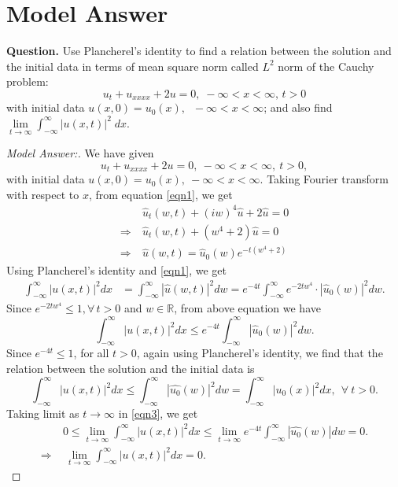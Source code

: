 \documentclass[12pt,leqno]{amsart}
\newcommand{\bb}[1]{\mathbb{#1}}
\numberwithin{equation}{section}
\theoremstyle{definition}
\begin{document}
\date{\today}

\baselineskip=16pt
\section{Model Answer}
\noindent
{\bf Question.} 
Use Plancherel's identity to find a relation between the solution and the initial data 
in terms of mean square norm called \(L^2\) norm of the Cauchy problem: 
$$u_t+u_{xxxx} +2u=0,\;-\infty < x < \infty,\, t>0$$ 
with initial data \(u(x,0)=u_0(x),\;\; -\infty < x < \infty\); and also find 
$\lim\limits_{t\to\infty} \int_{-\infty}^{\infty} |u(x,t)|^2\;dx$.

\begin{proof}[Model Answer:]
We have given 
\begin{equation}\label{eqn1}
u_t + u_{xxxx} + 2u = 0,\ -\infty < x < \infty,\ t > 0, 
\end{equation}
with initial data $u(x, 0) = u_0(x),\ -\infty < x < \infty$. 
Taking Fourier transform with respect to $x$, from equation \eqref{eqn1}, we get 
\begin{align}
&\ \widehat{u}_t(w, t) + (iw)^4\widehat{u} + 2\widehat{u} = 0 \nonumber \\
\Longrightarrow &\ \widehat{u}_t(w, t) + (w^4+2)\widehat{u} = 0 \nonumber \\ 
\Longrightarrow &\ \widehat{u}(w, t) = \widehat{u}_0(w) e^{-t(w^4+2)} \label{eqn2}
\end{align}
Using Plancherel's identity and \eqref{eqn1}, we get 
\begin{align*}
\int_{-\infty}^\infty |u(x, t)|^2 dx & = \int_{-\infty}^\infty |\widehat{u}(w, t)|^2 dw 
= e^{-4t} \int_{-\infty}^\infty e^{-2tw^4}\cdot |\widehat{u}_0(w)|^2dw. %
\end{align*}
Since $e^{-2tw^4} \leq 1, \forall\, t > 0$ and $w \in \bb R$, from above equation we have 
\begin{equation}\label{eqn3}
	\int_{-\infty}^\infty |u(x, t)|^2 dx \leq e^{-4t} \int_{-\infty}^\infty |\widehat{u}_0(w)|^2 dw. 
\end{equation}
Since $e^{-4t} \leq 1$, for all $t > 0$, again using Plancherel's identity, 
we find that the relation between the solution and the initial data is 
$$\int_{-\infty}^{\infty} |u(x,t)|^2 dx 
\leq \int_{-\infty}^{\infty} |\widehat{u_0}(w)|^2 dw 
= \int_{-\infty}^\infty |u_0(x)|^2 dx,\ \ \forall\ t > 0.$$ 
Taking limit as $t \to \infty$ in \eqref{eqn3}, we get 
\begin{align}
	& \ 0 \leq \lim\limits_{t\to\infty} \int_{-\infty}^{\infty} |u(x, t)|^2 dx 
	\leq \lim\limits_{t\to\infty} e^{-4t}\int_{-\infty}^{\infty} |\widehat{u_0}(w)| dw = 0. \nonumber \\ 
	\Longrightarrow & \ \ \lim\limits_{t\to\infty} \int_{-\infty}^{\infty} |u(x, t)|^2 dx  = 0. \nonumber
\end{align}
\end{proof}


\date{\today}
\end{document}
